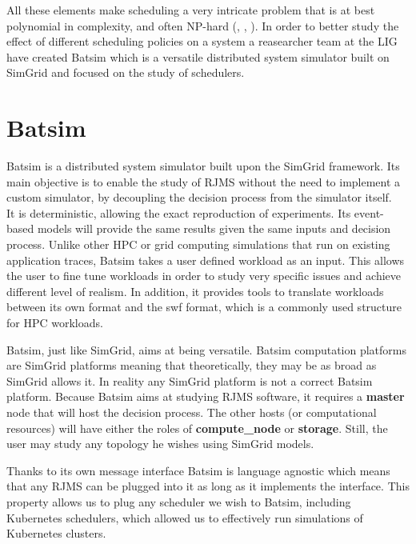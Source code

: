 All these elements make scheduling a very intricate problem that is at best
polynomial in complexity, and often NP-hard
(\cite{10.1016/S0022-0000(75)80008-0}, \cite{scheduler-complexity}, \cite{BLAZEWICZ198311}). In order
to better study the effect of different scheduling policies on a system a
reasearcher team at the LIG have created Batsim which is a versatile
distributed system simulator built on SimGrid and focused on the study of
schedulers.


\section{Batsim}

Batsim\cite{dutot:hal-01333471} is a distributed system simulator built upon
the SimGrid framework. Its main objective is to enable the study of RJMS
without the need to implement a custom simulator, by decoupling the decision
process from the simulator itself.\\

It is deterministic, allowing the exact reproduction of experiments.  Its
event-based models will provide the same results given the same inputs and
decision process.  Unlike other HPC or grid computing simulations that run on
existing application traces, Batsim takes a user defined workload as an input.
This allows the user to fine tune workloads in order to study very specific
issues and achieve different level of realism. In addition, it provides tools
to translate workloads between its own format and the swf format, which is a
commonly used structure for HPC workloads.

Batsim, just like SimGrid, aims at being versatile. 
Batsim computation platforms are
SimGrid platforms meaning that theoretically, they may be as broad as SimGrid
allows it. In reality any SimGrid platform is not a correct Batsim platform.
Because Batsim aims at studying RJMS software, it requires a \textbf{master}
node that will host the decision process. The other hosts (or computational
resources) will have either the roles of \textbf{compute\_node} or
\textbf{storage}. Still, the user may study any topology he wishes using
SimGrid models.

Thanks to its own message interface Batsim is language agnostic which means
that any RJMS can be plugged into it as long as it implements the interface.
This property allows us to plug any scheduler we wish to Batsim, including
Kubernetes schedulers, which allowed us to effectively run simulations of
Kubernetes clusters.

